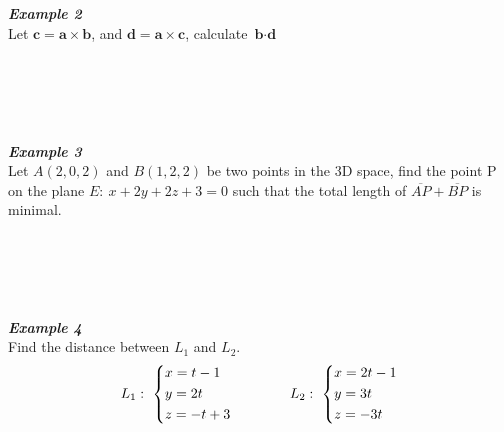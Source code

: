 \documentclass[12px]{article}
\begin{document}
\\
\\
\\
\\
\textit{\textbf{Example 2}}\\
Let $\textbf{c}=\textbf{a}\times\textbf{b}$, and $\textbf{d}=\textbf{a}\times\textbf{c}$, calculate $\textbf{b}\cdot\textbf{d}$\\
\\
\\
\\
\\
\\
\textit{\textbf{Example 3}}\\
Let $A(2,0,2)$ and $B(1,2,2)$ be two points in the 3D space, find the point P on the plane $E:\ x+2y+2z+3=0$ such that the total length of $\overline{AP}+\overline{BP}$ is minimal.\\
\\
\\
\\
\\
\\
\textit{\textbf{Example 4}}\\
Find the distance between $L_1$ and $L_2$.
$$L_1:\ \left\{\begin{aligned}
    &x=t-1\\
    &y=2t\\
    &z=-t+3
\end{aligned}\right.\hspace*{4em}
L_2:\ \left\{\begin{aligned}
    &x=2t-1\\
    &y=3t\\
    &z=-3t
\end{aligned}\right.
$$
\end{document}
